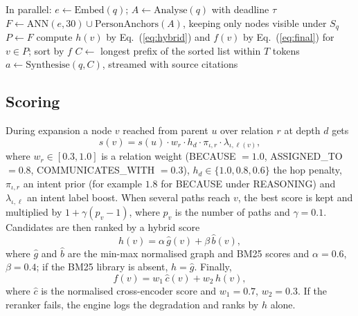 \documentclass[12pt,onecolumn,draftclsnofoot]{IEEEtran}
\begin{document}
\begin{algorithm}[t]
\caption{Lore query pipeline}
\label{alg:query}
In parallel: $e \leftarrow \mathrm{Embed}(q)$; $A \leftarrow \mathrm{Analyse}(q)$ with deadline $\tau$\;
$F \leftarrow \mathrm{ANN}(e, 30) \cup \mathrm{PersonAnchors}(A)$, keeping only nodes visible under $S_q$\;
$P \leftarrow F$\;
compute $h(v)$ by Eq.~(\ref{eq:hybrid}) and $f(v)$ by Eq.~(\ref{eq:final}) for $v\in P$; sort by $f$\;
$C \leftarrow$ longest prefix of the sorted list within $T$ tokens\;
$a \leftarrow \mathrm{Synthesise}(q, C)$, streamed with source citations\;
\end{algorithm}

\subsection{Scoring}
During expansion a node $v$ reached from parent $u$ over relation $r$ at depth $d$ gets
\begin{equation}
s(v) = s(u)\cdot w_r \cdot h_d \cdot \pi_{\iota,r} \cdot \lambda_{\iota,\ell(v)},
\label{eq:frontier}
\end{equation}
where $w_r\in[0.3,1.0]$ is a relation weight (BECAUSE $=1.0$, ASSIGNED\_TO $=0.8$, COMMUNICATES\_WITH $=0.3$), $h_d\in\{1.0, 0.8, 0.6\}$ the hop penalty, $\pi_{\iota,r}$ an intent prior (for example $1.8$ for BECAUSE under REASONING) and $\lambda_{\iota,\ell}$ an intent label boost. When several paths reach $v$, the best score is kept and multiplied by $1+\gamma(p_v-1)$, where $p_v$ is the number of paths and $\gamma=0.1$. Candidates are then ranked by a hybrid score
\begin{equation}
h(v) = \alpha\,\hat{g}(v) + \beta\,\hat{b}(v),
\label{eq:hybrid}
\end{equation}
where $\hat{g}$ and $\hat{b}$ are the min-max normalised graph and BM25 scores \cite{robertson2009bm25} and $\alpha=0.6$, $\beta=0.4$; if the BM25 library is absent, $h=\hat{g}$. Finally,
\begin{equation}
f(v) = w_1\,\hat{c}(v) + w_2\,h(v),
\label{eq:final}
\end{equation}
where $\hat{c}$ is the normalised cross-encoder score and $w_1=0.7$, $w_2=0.3$. If the reranker fails, the engine logs the degradation and ranks by $h$ alone.
\end{document}
